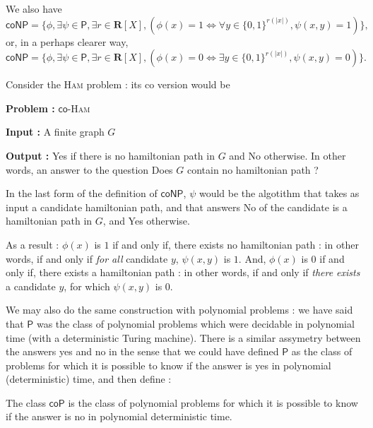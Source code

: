 \begin{proposition}
    We also have
    \[
        \mathsf{coNP} = \{ \phi, \exists \psi \in \mathsf P, \exists r \in \mathbf R[X], (\phi(x) = 1 \iff \forall y \in \{ 0,1 \}^{r(|x|)}, \psi(x,y) = 1 ) \},
    \]
    or, in a perhaps clearer way, 
    \[
        \mathsf{coNP} = \{ \phi, \exists \psi \in \mathsf P, \exists r \in \mathbf R[X], (\phi(x) = 0 \iff \exists y \in \{ 0,1 \}^{r(|x|)}, \psi(x,y) = 0 ) \}.
    \]
\end{proposition}

\begin{example}
    Consider the \textsc{Ham} problem : its \og co \fg version would be

    \begin{problem}
        \textbf{Problem :} $ \mathsf{co} $-\textsc{Ham}

        \textbf{Input :} A finite graph $ G $

        \textbf{Output :} \og Yes \fg if there is no hamiltonian path in $ G $ and \og No \fg otherwise. In other words, an answer to the question \og Does $ G $ \fg contain no hamiltonian path ?
    \end{problem}

    In the last form of the definition of $ \mathsf{coNP} $, $ \psi $ would be the algotithm that takes as input a candidate hamiltonian path, and that answers \og No \fg of the candidate is a hamiltonian path in $ G $, and \og Yes \fg otherwise.

    As a result : $ \phi(x) $ is $ 1 $ if and only if, there exists no hamiltonian path : in other words, if and only if \textit{for all} candidate $ y $, $ \psi(x,y) $ is $ 1 $. And, $ \phi(x) $ is $ 0 $ if and only if, there exists a hamiltonian path : in other words, if and only if \textit{there exists} a candidate $ y $, for which $ \psi(x,y) $ is $ 0 $.
\end{example}

We may also do the same construction with polynomial problems : we have said that $ \mathsf P $ was the class of polynomial problems which were decidable in polynomial time (with a deterministic Turing machine). There is a \og similar \fg assymetry between the answers \og yes \fg and \og no \fg in the sense that we could have defined $ \mathsf P $ as the class of problems for which it is possible to know if the answer is \og yes \fg in polynomial (deterministic) time, and then define :

\begin{definition}
    The class $ \mathsf{coP} $ is the class of polynomial problems for which it is possible to know if the answer is \og no \fg in polynomial deterministic time.
\end{definition}

